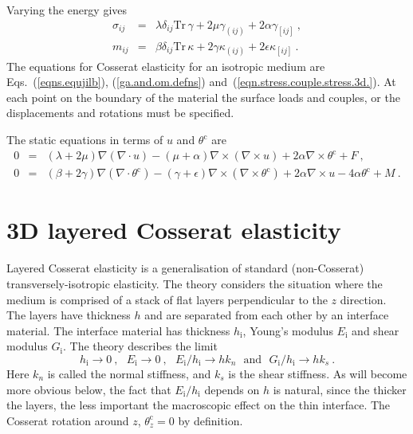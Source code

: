 \documentclass[]{scrreprt}
\newcommand{\si}{\sigma}
\newcommand{\thetac}{\theta^{\mathrm{c}}}
\newcommand{\ep}{\epsilon}
\newcommand{\ga}{\gamma}
\newcommand{\non}{\nonumber}
\newcommand{\de}{\delta}
\newcommand{\ka}{\kappa}
\newcommand{\la}{\lambda}
\newcommand{\tr}{\mbox{Tr}\,}
\newcommand{\al}{\alpha}
\newcommand{\be}{\beta}
\newcommand{\cd}{\cdot}
\begin{document}
Varying the energy gives
\begin{eqnarray}
\si_{ij} & = & \la\de_{ij}\tr\ga + 2\mu\ga_{(ij)} + 2\al\ga_{[ij]} \ ,
\non \\
m_{ij} & = & \be\de_{ij}\tr\ka + 2\ga\ka_{(ij)} + 2\ep\ka_{[ij]} \ .
\label{eqn.stress.couple.stress.3d.}
\end{eqnarray}
The equations for Cosserat elasticity for an isotropic medium are
Eqs.~(\ref{eqns.equjilb}), (\ref{ga.and.om.defns})
and~(\ref{eqn.stress.couple.stress.3d.}).  At each point on the
boundary of the material the surface loads and couples, or the
displacements and rotations must be specified.

The static equations in terms of $u$ and $\thetac$ are
\begin{eqnarray*}
0 & = & (\la+2\mu)\nabla(\nabla\cd u) -
(\mu+\al)\nabla\times(\nabla\times u) + 2\al\nabla\times\thetac + F
\ , \\
0 & = & (\be+2\ga)\nabla(\nabla\cd\thetac) -
(\ga+\ep)\nabla\times(\nabla\times\thetac) + 2\al\nabla\times u -
4\al\thetac + M \ .
\end{eqnarray*}


\chapter{3D layered Cosserat elasticity}

Layered Cosserat elasticity is a generalisation of standard
(non-Cosserat) transversely-isotropic elasticity.  The theory
considers the situation where the medium is comprised of a stack of
flat layers perpendicular to the $z$ direction.  The layers have
thickness $h$ and are separated from each other by an interface
material.  The interface material has thickness $h_{\mathrm{i}}$,
Young's modulus $E_{\mathrm{i}}$ and shear modulus $G_{\mathrm{i}}$.
The theory describes the limit
\begin{equation}
h_{\mathrm{i}} \rightarrow 0 \ , \ \ \
E_{\mathrm{i}} \rightarrow 0 \ , \ \ \
E_{\mathrm{i}}/h_{\mathrm{i}} \rightarrow hk_{n} \ \ \ \mbox{and}
\ \ \
G_{\mathrm{i}}/h_{\mathrm{i}} \rightarrow hk_{s} \ .
\label{thin.layer.limits.eqn}
\end{equation}
Here $k_{n}$ is called the normal stiffness, and $k_{s}$ is the shear
stiffness.  As will become more obvious below, the fact that
$E_{\mathrm{i}}/h_{\mathrm{i}}$ depends on $h$ is natural, since the
thicker the layers, the less important the macroscopic effect on the
thin interface.  The Cosserat rotation around $z$, $\thetac_{z}=0$ by
definition.
\end{document}
